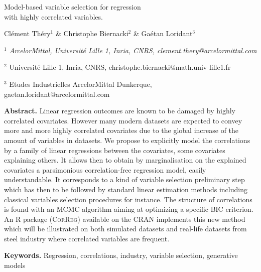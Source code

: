 \documentclass[11pt,a4paper]{article}
\begin{document}
\begin{center}
{\Large
	{\sc Model-based variable selection for regression \\ with highly correlated variables.}
}
\bigskip

  Clément Théry$^{1}$ \& Christophe Biernacki$^{2}$ \& Gaétan Loridant$^{3}$
\bigskip

{\it
$^{1}$ ArcelorMittal, Université Lille 1, Inria, CNRS, clement.thery@arcelormittal.com
 
$^{2}$ Université Lille 1, Inria, CNRS, christophe.biernacki@math.univ-lille1.fr

$^{3}$ Etudes Industrielles ArcelorMittal Dunkerque, gaetan.loridant@arcelormittal.com\textbf{}
}
\end{center}
\bigskip

{\bf Abstract.} Linear regression outcomes are known to be damaged by highly correlated covariates. However many modern datasets are expected to convey more and more highly correlated covariates due to the global increase of the amount of variables in datasets. We propose to explicitly model the correlations by a family of linear regressions between the covariates, some covariates explaining others. It allows then to obtain by marginalisation on the explained covariates a parsimonious correlation-free regression model, easily understandable. 
It corresponds to a kind of variable selection preliminary step which has then to be followed by standard linear estimation methods including classical variables selection procedures for instance. The structure of correlations is found with an MCMC algorithm aiming at optimizing a specific BIC criterion.
 An R package (\textsc{CorReg}) available on the CRAN implements this new method which will be illustrated on both simulated datasets and real-life datasets from steel industry where correlated variables are frequent.
\smallskip

{\bf Keywords.} Regression, correlations, industry, variable selection, generative models
\end{document}
